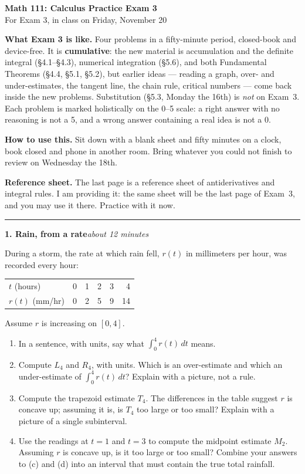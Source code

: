 \documentclass[11pt]{article}
\newcommand{\prob}[2]{\medskip\noindent\textbf{\large #1}\hfill\textit{#2}\par\smallskip}
\begin{document}
\begin{center}
{\Large\bfseries Math 111: Calculus \quad Practice Exam 3}\\[4pt]
{For Exam 3, in class on Friday, November 20}
\end{center}

\medskip
\noindent\textbf{What Exam 3 is like.} Four problems in a fifty-minute period, closed-book
and device-free. It is \textbf{cumulative}: the new material is accumulation and the
definite integral (\S4.1--\S4.3), numerical integration (\S5.6), and both Fundamental
Theorems (\S4.4, \S5.1, \S5.2), but earlier ideas --- reading a graph, over- and
under-estimates, the tangent line, the chain rule, critical numbers --- come back inside the
new problems. Substitution (\S5.3, Monday the 16th) is \emph{not} on Exam~3. Each problem is
marked holistically on the 0--5 scale: a right answer with no reasoning is not a 5, and a
wrong answer containing a real idea is not a 0.

\smallskip
\noindent\textbf{How to use this.} Sit down with a blank sheet and fifty minutes on a
clock, book closed and phone in another room. Bring whatever you could not finish to
review on Wednesday the 18th.

\smallskip
\noindent\textbf{Reference sheet.} The last page is a reference sheet of antiderivatives and
integral rules. I am providing it: the same sheet will be the last page of Exam~3, and you
may use it there. Practice with it now.

\bigskip\hrule

\prob{1. Rain, from a rate}{about 12 minutes}
During a storm, the rate at which rain fell, $r(t)$ in millimeters per hour, was
recorded every hour:
\smallskip
\begin{center}
\begin{tabular}{@{}lrrrrr@{}}
\toprule
$t$ (hours) & 0 & 1 & 2 & 3 & 4\\
$r(t)$ (mm/hr) & 0 & 2 & 5 & 9 & 14\\
\bottomrule
\end{tabular}
\end{center}
\smallskip
Assume $r$ is increasing on $[0,4]$.
\begin{enumerate}
\item In a sentence, with units, say what $\int_0^4 r(t)\,dt$ means.
\item Compute $L_4$ and $R_4$, with units. Which is an over-estimate and which an
under-estimate of $\int_0^4 r(t)\,dt$? Explain with a picture, not a rule.
\item Compute the trapezoid estimate $T_4$. The differences in the table suggest $r$ is
concave up; assuming it is, is $T_4$ too large or too small? Explain with a picture of a
single subinterval.
\item Use the readings at $t=1$ and $t=3$ to compute the midpoint estimate $M_2$. Assuming
$r$ is concave up, is it too large or too small? Combine your answers to (c) and (d) into
an interval that must contain the true total rainfall.
\end{enumerate}
\end{document}
